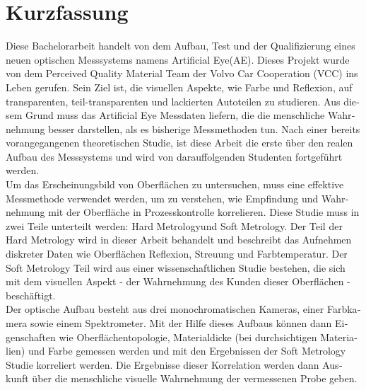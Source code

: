 \chapter*{Kurzfassung}
\label{kurzfassung}

\begin{otherlanguage}{ngerman}

Diese Bachelorarbeit handelt von dem Aufbau, Test und der Qualifizierung eines neuen optischen Messsystems namens \glqq Artificial Eye\grqq (AE). Dieses Projekt wurde von dem Perceived Quality Material Team der Volvo Car Cooperation (VCC) ins Leben gerufen. Sein Ziel ist, die visuellen Aspekte, wie Farbe und Reflexion, auf transparenten, teil-transparenten und lackierten Autoteilen zu studieren. Aus diesem Grund muss das Artificial Eye Messdaten liefern, die die menschliche Wahrnehmung besser darstellen, als es bisherige Messmethoden tun. Nach einer bereits vorangegangenen theoretischen Studie, ist diese Arbeit die erste über den realen Aufbau des Messsystems und wird von darauffolgenden Studenten fortgeführt werden.\\

Um das Erscheinungsbild von Oberflächen zu untersuchen, muss eine effektive Messmethode verwendet werden, um zu verstehen, wie Empfindung und Wahrnehmung mit der Oberfläche in Prozesskontrolle korrelieren. Diese Studie muss in zwei Teile unterteilt werden: \glqq Hard Metrology\grqq und \glqq Soft Metrology\grqq. Der Teil der Hard Metrology wird in dieser Arbeit behandelt und beschreibt das Aufnehmen diskreter Daten wie Oberflächen Reflexion, Streuung und Farbtemperatur. Der Soft Metrology Teil wird aus einer wissenschaftlichen Studie bestehen, die sich mit dem visuellen Aspekt - der Wahrnehmung des Kunden dieser Oberflächen - beschäftigt.\\

Der optische Aufbau besteht aus drei monochromatischen Kameras, einer Farbkamera sowie einem Spektrometer. Mit der Hilfe dieses Aufbaus können dann Eigenschaften wie Oberflächentopologie, Materialdicke (bei durchsichtigen Materialien) und Farbe gemessen werden und mit den Ergebnissen der Soft Metrology Studie korreliert werden. Die Ergebnisse dieser Korrelation werden dann Auskunft über die menschliche visuelle Wahrnehmung der vermessenen Probe geben.
\end{otherlanguage}
